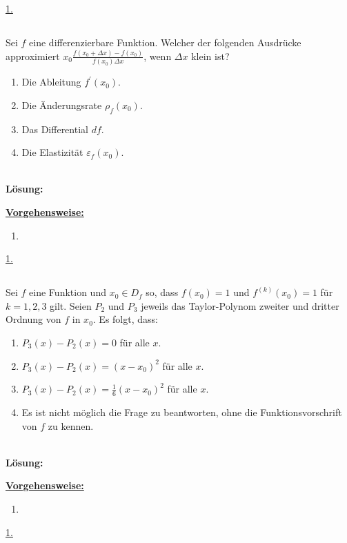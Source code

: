 \underline{1. }\\



\newpage
\subsection*{}
Sei $f$ eine differenzierbare Funktion. Welcher der folgenden Ausdrücke approximiert 
$x_0 \frac{f(x_0 + \Delta x) - f(x_0)}{f(x_0) \Delta x}$, wenn $\Delta x$ klein ist?
\renewcommand{\labelenumi}{(\alph{enumi})}
\begin{enumerate}
	\item 
	Die Ableitung $f^\prime(x_0)$.
	\item
	Die Änderungsrate $\rho_f(x_0)$.	
	\item
	Das Differential $df$.
	\item
	Die Elastizität $\varepsilon_f(x_0)$.
\end{enumerate}
\ \\
\textbf{Lösung:}
\begin{mdframed}
	\underline{\textbf{Vorgehensweise:}}
	\renewcommand{\labelenumi}{\theenumi.}
	\begin{enumerate}
		\item 
	\end{enumerate}
\end{mdframed}

\underline{1. }\\



\newpage
\subsection*{}
Sei $f$ eine Funktion und $x_0 \in D_f$ so, dass $f(x_0) = 1$ und $f^{(k)}(x_0) = 1$ für $k = 1,2,3$ gilt. Seien $P_2$ und $P_3$ jeweils das Taylor-Polynom zweiter und dritter Ordnung von $f$ in $x_0$. Es folgt, dass:
\renewcommand{\labelenumi}{(\alph{enumi})}
\begin{enumerate}
	\item 
	$P_3(x) - P_2(x) = 0 $ für alle $x$.
	\item
	$P_3(x) - P_2(x) = (x - x_0)^2 $ für alle $x$.
	\item
	$P_3(x) - P_2(x) = \frac{1}{6} (x - x_0)^2 $ für alle $x$.
	\item
	Es ist nicht möglich die Frage zu beantworten, ohne die Funktionsvorschrift von $f$ zu kennen.
\end{enumerate}
\ \\
\textbf{Lösung:}
\begin{mdframed}
	\underline{\textbf{Vorgehensweise:}}
	\renewcommand{\labelenumi}{\theenumi.}
	\begin{enumerate}
		\item 
	\end{enumerate}
\end{mdframed}

\underline{1. }\\


